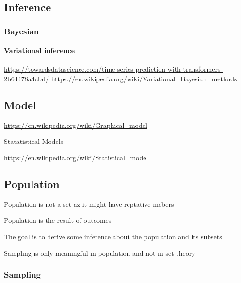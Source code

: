 \documentclass{book}
\begin{document}
\subsection{Inference}

\subsubsection{Bayesian}

\paragraph{Variational inference}


\url{https://towardsdatascience.com/time-series-prediction-with-transformers-2b64478a4cbd/}
\url{https://en.wikipedia.org/wiki/Variational_Bayesian_methods}

\subsection{Model}


\url{https://en.wikipedia.org/wiki/Graphical_model}


Statatistical Models

\url{https://en.wikipedia.org/wiki/Statistical_model}

\subsection{Population}


Population is not a set az it might have reptative mebers

Population is the result of outcomes

The goal is to derive some inference about the population and its subsets

Sampling is only meaningful in population and not in set theory

\subsubsection{Sampling}
\end{document}
